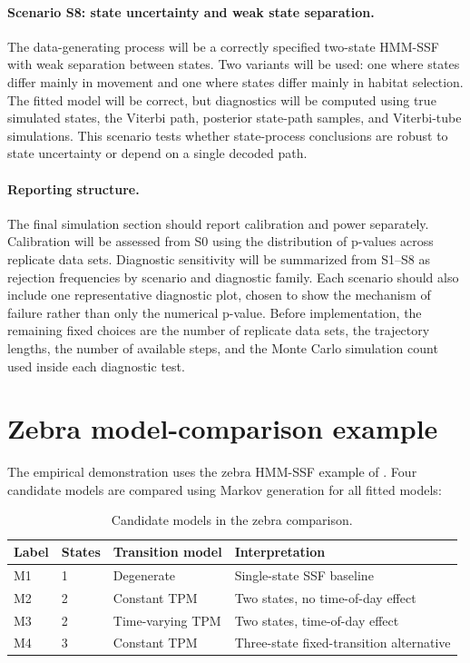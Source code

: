 \documentclass[11pt]{article}
\begin{document}
\paragraph{Scenario S8: state uncertainty and weak state separation.}
The data-generating process will be a correctly specified two-state HMM-SSF
with weak separation between states. Two variants will be used: one where
states differ mainly in movement and one where states differ mainly in habitat
selection. The fitted model will be correct, but diagnostics will be computed
using true simulated states, the Viterbi path, posterior state-path samples,
and Viterbi-tube simulations. This scenario tests whether state-process
conclusions are robust to state uncertainty or depend on a single decoded path.

\paragraph{Reporting structure.}
The final simulation section should report calibration and power separately.
Calibration will be assessed from S0 using the distribution of p-values across
replicate data sets. Diagnostic sensitivity will be summarized from S1--S8 as
rejection frequencies by scenario and diagnostic family. Each scenario should
also include one representative diagnostic plot, chosen to show the mechanism
of failure rather than only the numerical p-value. Before implementation, the
remaining fixed choices are the number of replicate data sets, the trajectory
lengths, the number of available steps, and the Monte Carlo simulation count
used inside each diagnostic test.

\FloatBarrier

\section{Zebra model-comparison example}

The empirical demonstration uses the zebra HMM-SSF example of
\citet{klappstein2023}. Four candidate models are compared using Markov
generation for all fitted models:

\begin{table}[ht]
\centering
\caption{Candidate models in the zebra comparison.}
\label{tab:zebra-models}
\begin{tabular}{llll}
\toprule
Label & States & Transition model & Interpretation \\
\midrule
M1 & 1 & Degenerate & Single-state SSF baseline \\
M2 & 2 & Constant TPM & Two states, no time-of-day effect \\
M3 & 2 & Time-varying TPM & Two states, time-of-day effect \\
M4 & 3 & Constant TPM & Three-state fixed-transition alternative \\
\bottomrule
\end{tabular}
\end{table}
\end{document}
